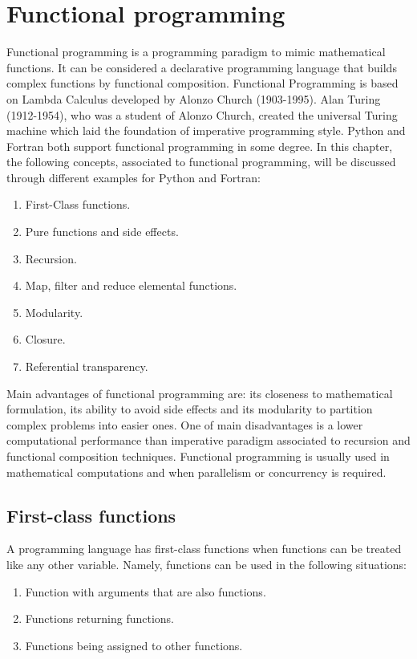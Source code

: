 \chapter{Functional programming} 
\vspace{-1cm}
Functional programming is a programming paradigm 
to mimic mathematical functions. 
It can be considered a declarative programming language 
that builds complex functions by functional composition. 
Functional Programming is based on Lambda Calculus developed 
by Alonzo Church (1903-1995). 
Alan Turing (1912-1954), who was a student of Alonzo Church, created the 
universal Turing machine which laid the foundation of imperative 
programming style.
Python and Fortran both support functional programming in some degree.  
In this chapter, the following concepts, associated to functional 
programming, will be discussed through  different examples 
for Python and Fortran:  
\begin{enumerate} 
 \setlength\itemsep{0cm}
\item First-Class functions.
\item Pure functions and side effects.
\item Recursion. 
\item Map, filter and reduce elemental functions.  
\item Modularity. 
\item Closure.
\item Referential transparency. 
\end{enumerate} 
Main advantages of functional programming are: its closeness 
to mathematical formulation, its ability to avoid side effects and 
its modularity to partition complex problems into easier ones.
One of main disadvantages is a lower  computational performance 
than imperative paradigm associated to recursion and functional composition
techniques.  Functional programming is usually used in mathematical 
computations and when parallelism or concurrency is required.


 
\newpage
 \section{First-class functions} 
A programming language has first-class functions 
when functions can be treated like any other variable. 
Namely, functions can be used in the following situations:  
\begin{enumerate} 
\item Function with arguments that are also functions.
\item Functions returning functions. 
\item Functions being assigned to other functions.
\end{enumerate} 

